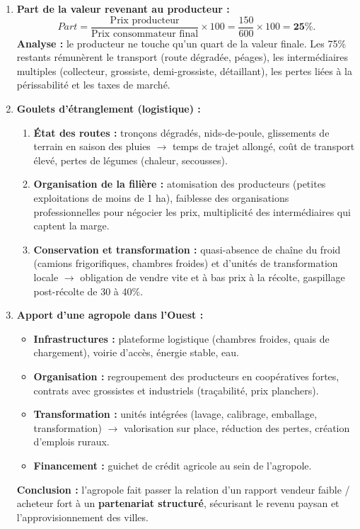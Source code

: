 \documentclass[11pt]{article}
\begin{document}
\begin{exoresolu}
\begin{enumerate}
\begin{center}
\begin{tabularx}{\linewidth}{|l|X|X|}
    \end{tabularx}
    \end{center}
    \item \textbf{Part de la valeur revenant au producteur :}
    \[Part = \frac{\text{Prix producteur}}{\text{Prix consommateur final}} \times 100 = \frac{150}{600} \times 100 = \textbf{25\%}.\]
    \textbf{Analyse :} le producteur ne touche qu'un quart de la valeur finale. Les 75\% restants rémunèrent le transport (route dégradée, péages), les intermédiaires multiples (collecteur, grossiste, demi-grossiste, détaillant), les pertes liées à la périssabilité et les taxes de marché.
    \item \textbf{Goulets d'étranglement (logistique) :}
    \begin{enumerate}
        \item \textbf{État des routes :} tronçons dégradés, nids-de-poule, glissements de terrain en saison des pluies $\rightarrow$ temps de trajet allongé, coût de transport élevé, pertes de légumes (chaleur, secousses).
        \item \textbf{Organisation de la filière :} atomisation des producteurs (petites exploitations de moins de 1 ha), faiblesse des organisations professionnelles pour négocier les prix, multiplicité des intermédiaires qui captent la marge.
        \item \textbf{Conservation et transformation :} quasi-absence de chaîne du froid (camions frigorifiques, chambres froides) et d'unités de transformation locale $\rightarrow$ obligation de vendre vite et à bas prix à la récolte, gaspillage post-récolte de 30 à 40\%.
    \end{enumerate}
    \item \textbf{Apport d'une agropole dans l'Ouest :}
    \begin{itemize}
        \item \textbf{Infrastructures :} plateforme logistique (chambres froides, quais de chargement), voirie d'accès, énergie stable, eau.
        \item \textbf{Organisation :} regroupement des producteurs en coopératives fortes, contrats avec grossistes et industriels (traçabilité, prix planchers).
        \item \textbf{Transformation :} unités intégrées (lavage, calibrage, emballage, transformation) $\rightarrow$ valorisation sur place, réduction des pertes, création d'emplois ruraux.
        \item \textbf{Financement :} guichet de crédit agricole au sein de l'agropole.
    \end{itemize}
    \textbf{Conclusion :} l'agropole fait passer la relation d'un rapport \og vendeur faible / acheteur fort \fg{} à un \textbf{partenariat structuré}, sécurisant le revenu paysan et l'approvisionnement des villes.
\end{enumerate}
\end{exoresolu}
\end{document}
